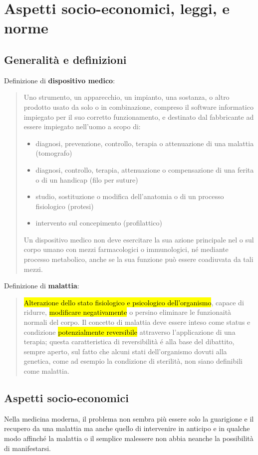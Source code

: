 \documentclass[a4paper]{article}
\begin{document}
\section{Aspetti socio-economici, leggi, e norme}
\subsection{Generalità e definizioni}
Definizione di \textbf{dispositivo medico}:
\begin{quote}
    \centering
    Uno strumento, un apparecchio, un impianto, una sostanza, o altro prodotto 
    usato da solo o in combinazione, compreso il software informatico impiegato 
    per il suo corretto funzionamento, e destinato dal fabbricante ad essere 
    impiegato nell'uomo a scopo di:
    \begin{itemize}
        \item diagnosi, prevenzione, controllo, terapia o attenuazione di una 
        malattia (tomografo)
        \item diagnosi, controllo, terapia, attenuazione o compensazione di 
        una ferita o di un handicap (filo per suture)
        \item studio, sostituzione o modifica dell'anatomia o di un processo 
        fisiologico (protesi)
        \item intervento sul concepimento (profilattico)
    \end{itemize}
    Un dispositivo medico non deve esercitare la sua azione principale nel o 
    sul corpo umano con mezzi farmacologici o immunologici, né mediante processo 
    metabolico, anche se la sua funzione può essere coadiuvata da tali mezzi. 
\end{quote}
Definizione di \textbf{malattia}:
\begin{quote}
    \centering
    \hl{Alterazione dello stato fisiologico e psicologico dell'organismo}, capace di 
    ridurre, \hl{modificare negativamente} o persino eliminare le funzionaità normali 
    del corpo. Il concetto di malattia deve essere inteso come status e condizione 
    \hl{potenzialmente reversibile} attraverso l'applicazione di una terapia; questa 
    caratteristica di reversibilità é alla base del dibattito, sempre aperto, sul 
    fatto che alcuni stati dell'organismo dovuti alla genetica, come ad esempio la 
    condizione di sterilità, non siano definibili come malattia.
\end{quote}
\subsection{Aspetti socio-economici}
Nella medicina moderna, il problema non sembra più essere solo la guarigione e il 
recupero da una malattia ma anche quello di intervenire in anticipo e in qualche 
modo affinché la malattia o il semplice malessere non abbia neanche la possibilità 
di manifestarsi.
\end{document}
